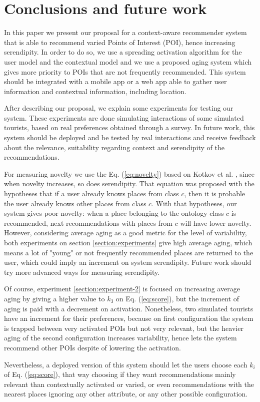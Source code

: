 \section{Conclusions and future work} \label{section:conclu}

In this paper we present our proposal for a context-aware recommender system that is able to recommend varied Points of Interest (POI), hence increasing serendipity. In order to do so, we use a spreading activation algorithm for the user model and the contextual model and we use a proposed aging system which gives more priority to POIs that are not frequently recommended. This system should be integrated with a mobile app or a web app able to gather user information and contextual information, including location.

After describing our proposal, we explain some experiments for testing our system. These experiments are done simulating interactions of some simulated tourists, based on real preferences obtained through a survey. In future work, this system should be deployed and be tested by real interactions and receive feedback about the relevance, suitability regarding context and serendipity of the recommendations.

For measuring novelty we use the Eq. (\ref{eq:novelty}) based on Kotkov et al. \cite{kotkov2016survey}, since when novelty increases, so does serendipity. That equation was proposed with the hypotheses that if a user already knows places from class $c$, then it is probable the user already knows other places from class $c$. With that hypotheses, our system gives poor novelty: when a place belonging to the ontology class $c$ is recommended, next recommendations with places from $c$ will have lower novelty. However, considering average aging as a good metric for the level of variability, both experiments on section \ref{section:experiments} give high average aging, which means a lot of "young" or not frequently recommended places are returned to the user, which could imply an increment on system serendipity. Future work should try more advanced ways for measuring serendipity.

Of course, experiment \ref{section:experiment-2} is focused on increasing average aging by giving a higher value to $k_3$ on Eq. (\ref{eq:score}), but the increment of aging is paid with a decrement on activation. Nonetheless, two simulated tourists have an increment for their preferences, because on first configuration the system is trapped between very activated POIs but not very relevant, but the heavier aging of the second configuration increases variability, hence lets the system recommend other POIs despite of lowering the activation. 

Nevertheless, a deployed version of this system should let the users choose each $k_i$ of Eq. (\ref{eq:score}), that way choosing if they want recommendations mainly relevant than contextually activated or varied, or even recommendations with the nearest places ignoring any other attribute, or any other possible configuration.